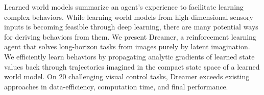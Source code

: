 Learned world models summarize an agent's experience to facilitate learning complex behaviors. While learning world models from high-dimensional sensory inputs is becoming feasible through deep learning, there are many potential ways for deriving behaviors from them. We present Dreamer, a reinforcement learning agent that solves long-horizon tasks from images purely by latent imagination. We efficiently learn behaviors by propagating analytic gradients of learned state values back through trajectories imagined in the compact state space of a learned world model. On 20 challenging visual control tasks, Dreamer exceeds existing approaches in data-efficiency, computation time, and final performance.